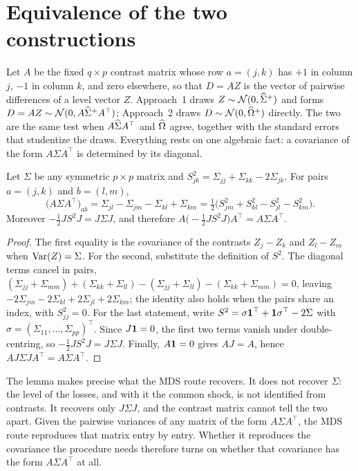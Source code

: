 \section{Equivalence of the two constructions}
\label{sec:equivalence}

Let $A$ be the fixed $q\times p$ contrast matrix whose row $a=(j,k)$ has $+1$ in column
$j$, $-1$ in column $k$, and zero elsewhere, so that $D = A Z$ is the vector of pairwise
differences of a level vector $Z$. Approach~1 draws $Z\sim\mathcal{N}(0,\widehat{\Sigma}^{+})$ and forms
$D=AZ\sim\mathcal{N}(0,A\widehat{\Sigma}^{+} A^\top)$; Approach~2 draws $D\sim\mathcal{N}(0,\widehat{\Omega}^{+})$
directly. The two are the same test when $A\widehat{\Sigma} A^\top$ and $\widehat{\Omega}$ agree, together
with the standard errors that studentize the draws. Everything rests on one algebraic
fact: a covariance of the form $A\Sigma A^\top$ is determined by its diagonal.

\begin{lemma}[Polarization]
\label{lem:polarization}
Let $\Sigma$ be any symmetric $p\times p$ matrix and
$S^2_{jk}=\Sigma_{jj}+\Sigma_{kk}-2\Sigma_{jk}$. For pairs $a=(j,k)$ and $b=(l,m)$,
\begin{equation}
  \big(A\Sigma A^\top\big)_{ab}
  = \Sigma_{jl}-\Sigma_{jm}-\Sigma_{kl}+\Sigma_{km}
  = \tfrac12\big(S^2_{jm}+S^2_{kl}-S^2_{jl}-S^2_{km}\big).
  \label{eq:polarization}
\end{equation}
Moreover $-\tfrac12 J S^2 J = J\Sigma J$, and therefore
$A\big(-\tfrac12 J S^2 J\big)A^\top = A\Sigma A^\top$.
\end{lemma}

\begin{proof}
The first equality is the covariance of the contrasts $Z_j-Z_k$ and $Z_l-Z_m$ when
$\operatorname{Var}(Z)=\Sigma$. For the second, substitute the definition of $S^2$. The diagonal terms
cancel in pairs,
$(\Sigma_{jj}+\Sigma_{mm})+(\Sigma_{kk}+\Sigma_{ll})-(\Sigma_{jj}+\Sigma_{ll})
-(\Sigma_{kk}+\Sigma_{mm})=0$, leaving
$-2\Sigma_{jm}-2\Sigma_{kl}+2\Sigma_{jl}+2\Sigma_{km}$; the identity also holds when
the pairs share an index, with $S^2_{jj}=0$. For the last statement, write
$S^2=\sigma\mathbf{1}^\top+\mathbf{1}\sigma^\top-2\Sigma$ with $\sigma=(\Sigma_{11},\dots,
\Sigma_{pp})^\top$. Since $J\mathbf{1}=0$, the first two terms vanish under double-centring,
so $-\tfrac12 JS^2J=J\Sigma J$. Finally, $A\mathbf{1}=0$ gives $AJ=A$, hence
$AJ\Sigma JA^\top=A\Sigma A^\top$.
\end{proof}

The lemma makes precise what the MDS route recovers. It does not recover $\Sigma$: the
level of the losses, and with it the common shock, is not identified from contrasts. It
recovers only $J\Sigma J$, and the contrast matrix cannot tell the two apart. Given the
pairwise variances of any matrix of the form $A\Sigma A^\top$, the MDS route reproduces
that matrix entry by entry. Whether it reproduces the covariance the procedure needs
therefore turns on whether that covariance has the form $A\Sigma A^\top$ at all.

